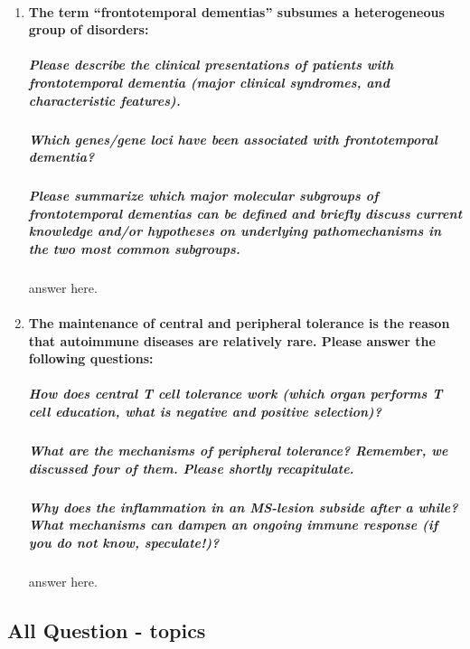 \documentclass[12pt,article,oneside,a4paper]{memoir}
\begin{document}
\begin{enumerate}
\item \paragraph{The term ``frontotemporal dementias'' subsumes a heterogeneous group of disorders:}
\subparagraph{Please describe the clinical presentations of patients with frontotemporal dementia (major clinical syndromes, and characteristic features).} \subparagraph{Which genes/gene loci have been associated with frontotemporal dementia?} \subparagraph{Please summarize which major molecular subgroups of frontotemporal dementias can be defined and briefly discuss current knowledge and/or hypotheses on underlying pathomechanisms in the two most common subgroups.} answer here.

\item \paragraph{The maintenance of central and peripheral tolerance is the reason that autoimmune diseases are relatively rare. Please answer the following questions:} \subparagraph{How does central T cell tolerance work (which organ performs T cell education, what is negative and positive selection)?} \subparagraph{What are the mechanisms of peripheral tolerance? Remember, we discussed four of them. Please shortly recapitulate.} \subparagraph{Why does the inflammation in an MS-lesion subside after a while? What mechanisms can dampen an ongoing immune response (if you do not know,
speculate!)?} answer here.

\end{enumerate}

\subsection{All Question - topics}
\end{document}
